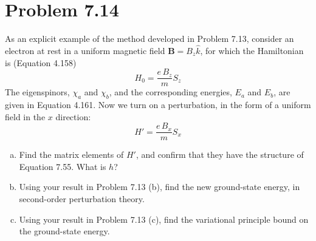 \documentclass[12 pt]{article}
\numberwithin{equation}{section}
\begin{document}
\section{Problem 7.14}
As an explicit example of the method developed in Problem 7.13, consider an electron at rest in a 
uniform magnetic field $\mathbf{B} = B_z\hat{k}$, for which the Hamiltonian is (Equation 4.158)
\begin{equation}\label{eq41}
  H_0 = \frac{e\,B_z}{m}S_z
\end{equation}
The eigenspinors, $\chi_a$ and $\chi_b$, and the corresponding energies, $E_a$ and $E_b$, are 
given in Equation 4.161. Now we turn on a perturbation, in the form of a uniform field in the $x$
direction: 
\begin{equation}\label{eq42}
  H' = \frac{e\,B_x}{m}S_x
\end{equation}
\begin{enumerate}[a)]
  \item Find the matrix elements of $H'$, and confirm that they have the structure of Equation 7.55.
    What is $h$?
  \item Using your result in Problem 7.13 (b), find the new ground-state energy, in second-order 
    perturbation theory.
  \item Using your result in Problem 7.13 (c), find the variational principle bound on the 
    ground-state energy.
\end{enumerate}
\end{document}
